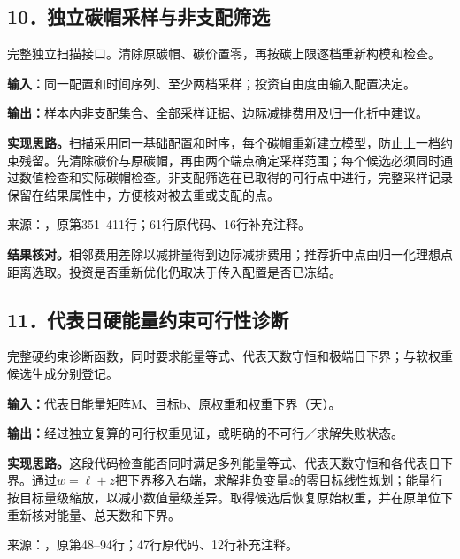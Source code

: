 \subsection*{10．独立碳帽采样与非支配筛选}
完整独立扫描接口。清除原碳帽、碳价置零，再按碳上限逐档重新构模和检查。

\noindent\textbf{输入：}同一配置和时间序列、至少两档采样；投资自由度由输入配置决定。\par
\noindent\textbf{输出：}样本内非支配集合、全部采样证据、边际减排费用及归一化折中建议。\par

\noindent\textbf{实现思路。}扫描采用同一基础配置和时序，每个碳帽重新建立模型，防止上一档约束残留。先清除碳价与原碳帽，再由两个端点确定采样范围；每个候选必须同时通过数值检查和实际碳帽检查。非支配筛选在已取得的可行点中进行，完整采样记录保留在结果属性中，方便核对被去重或支配的点。

{\small 来源：，原第351--411行；61行原代码、16行补充注释。}\par

\begingroup
{}

\endgroup

\noindent\textbf{结果核对。}相邻费用差除以减排量得到边际减排费用；推荐折中点由归一化理想点距离选取。投资是否重新优化仍取决于传入配置是否已冻结。

\subsection*{11．代表日硬能量约束可行性诊断}
完整硬约束诊断函数，同时要求能量等式、代表天数守恒和极端日下界；与软权重候选生成分别登记。

\noindent\textbf{输入：}代表日能量矩阵M、目标b、原权重和权重下界（天）。\par
\noindent\textbf{输出：}经过独立复算的可行权重见证，或明确的不可行／求解失败状态。\par

\noindent\textbf{实现思路。}这段代码检查能否同时满足多列能量等式、代表天数守恒和各代表日下界。通过$w=\ell+z$把下界移入右端，求解非负变量$z$的零目标线性规划；能量行按目标量级缩放，以减小数值量级差异。取得候选后恢复原始权重，并在原单位下重新核对能量、总天数和下界。

{\small 来源：，原第48--94行；47行原代码、12行补充注释。}\par

\begingroup
{}

\endgroup

